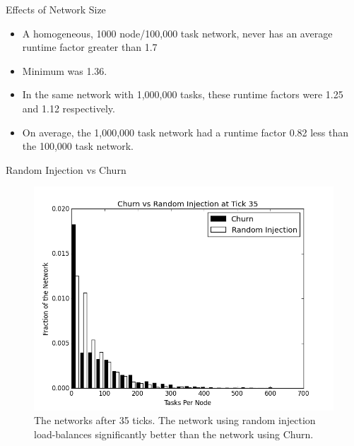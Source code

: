 \documentclass[11pt]{beamer}
\begin{document}
\begin{frame}{Effects of Network Size}
	\begin{itemize}
		\item A homogeneous, 1000 node/100,000 task network, never has an average runtime factor greater than 1.7
		\item Minimum was 1.36.
		\item In the same network with 1,000,000 tasks, these runtime factors were 1.25 and 1.12 respectively.
		\item On average, the 1,000,000 task network had a runtime factor 0.82 less than the 100,000 task network.
	\end{itemize}
\end{frame}



\begin{frame}{Random Injection vs Churn}
\begin{figure}
	\centering
	\includegraphics[width=0.7\linewidth]{figs/churnInjectionHist35}
	\caption[Churn vs Random Injection after 35 ticks.]{The networks after 35 ticks.  The network using random injection load-balances significantly better than the network using Churn.}
	\label{fig:churnInjectionHist35}
\end{figure}

\end{frame}
\end{document}
